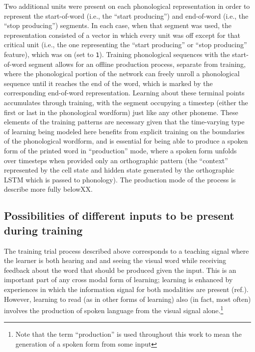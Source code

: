 \documentclass[
  american,
  ,man,floatsintext]{apa6}
\begin{document}
Two additional units were present on each phonological representation in order to represent the start-of-word (i.e., the ``start producing'') and end-of-word (i.e., the ``stop producing'') segments. In each case, when that segment was used, the representation consisted of a vector in which every unit was off except for that critical unit (i.e., the one representing the ``start producing'' or ``stop producing'' feature), which was on (set to \texttt{1}). Training phonological sequences with the start-of-word segment allows for an offline production process, separate from training, where the phonological portion of the network can freely unroll a phonological sequence until it reaches the end of the word, which is marked by the corresponding end-of-word representation. Learning about these terminal points accumulates through training, with the segment occupying a timestep (either the first or last in the phonological wordform) just like any other phoneme. These elements of the training patterns are necessary given that the time-varying type of learning being modeled here benefits from explicit training on the boundaries of the phonological wordform, and is essential for being able to produce a spoken form of the printed word in ``production'' mode, where a spoken form unfolds over timesteps when provided only an orthographic pattern (the ``context'' represented by the cell state and hidden state generated by the orthographic LSTM which is passed to phonology). The production mode of the process is describe more fully belowXX.

\hypertarget{possibilities-of-different-inputs-to-be-present-during-training}{%
\subsection{Possibilities of different inputs to be present during training}\label{possibilities-of-different-inputs-to-be-present-during-training}}

The training trial process described above corresponds to a teaching signal where the learner is both hearing and and seeing the visual word while receiving feedback about the word that should be produced given the input. This is an important part of any cross modal form of learning; learning is enhanced by experiences in which the information signal for both modalities are present (ref.). However, learning to read (as in other forms of learning) also (in fact, most often) involves the production of spoken language from the visual signal alone.\footnote{Note that the term ``production'' is used throughout this work to mean the generation of a spoken form from some input}
\end{document}
